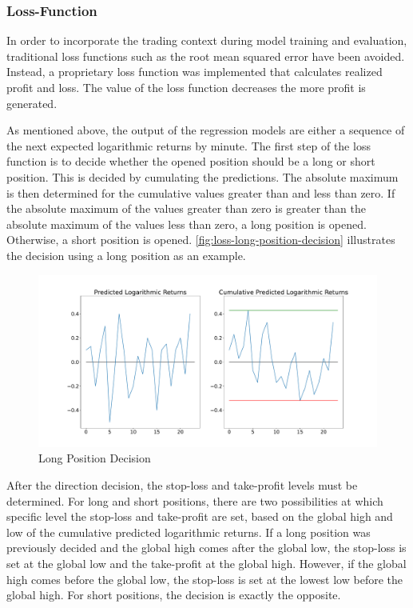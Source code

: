 \subsubsection{Loss-Function}
\label{chap:regression-loss}

In order to incorporate the trading context during model training and evaluation, traditional loss functions such as the root mean squared error have been avoided.
Instead, a proprietary loss function was implemented that calculates realized profit and loss.
The value of the loss function decreases the more profit is generated.

As mentioned above, the output of the regression models are either a sequence of the next expected logarithmic returns by minute.
The first step of the loss function is to decide whether the opened position should be a long or short position.
This is decided by cumulating the predictions.
The absolute maximum is then determined for the cumulative values greater than and less than zero.
If the absolute maximum of the values greater than zero is greater than the absolute maximum of the values less than zero, a long position is opened.
Otherwise, a short position is opened.
\autoref{fig:loss-long-position-decision} illustrates the decision using a long position as an example.

\begin{figure}[H]
    \centering
    \includegraphics[width=\textwidth]{images/models/loss_direction}
    \caption{Long Position Decision}
    \label{fig:loss-long-position-decision}
\end{figure}

After the direction decision, the stop-loss and take-profit levels must be determined.
For long and short positions, there are two possibilities at which specific level the stop-loss and take-profit are set, based on the global high and low of the cumulative predicted logarithmic returns.
If a long position was previously decided and the global high comes after the global low, the stop-loss is set at the global low and the take-profit at the global high.
However, if the global high comes before the global low, the stop-loss is set at the lowest low before the global high.
For short positions, the decision is exactly the opposite.

